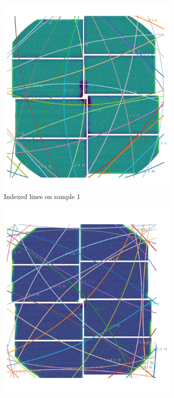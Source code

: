 \begin{figure}
	\centering
	\begin{subfigure}{0.35\textwidth}
		\includegraphics[width=\linewidth]{images/kossel_gaas1.pdf}
		\caption{Indexed lines on sample 1}
	\end{subfigure}
\hspace{0.2cm}
	\begin{subfigure}{0.35\textwidth}
		\includegraphics[width=\linewidth]{images/kossel_gaas2.pdf}

\end{subfigure}
\end{figure}
